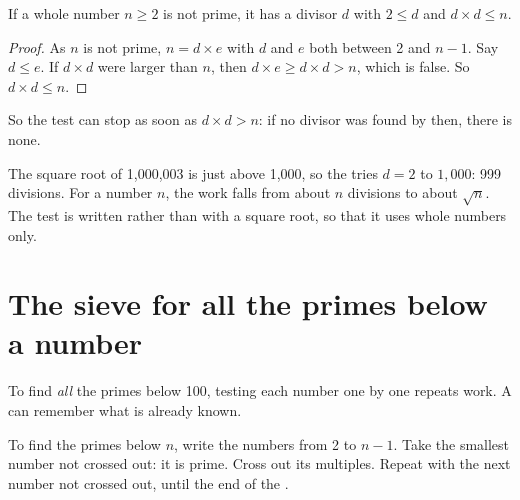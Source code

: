 \begin{proposition}\label{prop:g9:algorithms-on-numbers:sqrt-bound}
If a whole number $n \ge 2$ is not prime, it has a divisor $d$ with $2 \le d$ and
$d \times d \le n$.
\end{proposition}

\begin{proof}
As $n$ is not prime, $n = d \times e$ with $d$ and $e$ both between 2 and
$n - 1$. Say $d \le e$. If $d \times d$ were larger than $n$, then
$d \times e \ge d \times d > n$, which is false. So $d \times d \le n$.
\end{proof}

So the test can stop as soon as $d \times d > n$: if no divisor was found by
then, there is none.

\label{lst:g9:algorithms-on-numbers:fast}

\label{out:g9:algorithms-on-numbers:fast}

The square root of 1,000,003 is just above 1,000, so the  tries $d = 2$ to
$1{,}000$: 999 divisions. For a number $n$, the work falls from about $n$
divisions to about $\sqrt{n}$. The test is written  rather than
with a square root, so that it uses whole numbers only.

\section{The sieve for all the primes below a number}

To find \emph{all} the primes below 100, testing each number one by one repeats
work. A  can remember what is already known.

\begin{method}\label{met:g9:algorithms-on-numbers:sieve}
To find the primes below $n$, write the numbers
from 2 to $n - 1$. Take the smallest number not crossed out: it is prime. Cross
out its multiples. Repeat with the next number not crossed out, until the end of
the .
\end{method}

